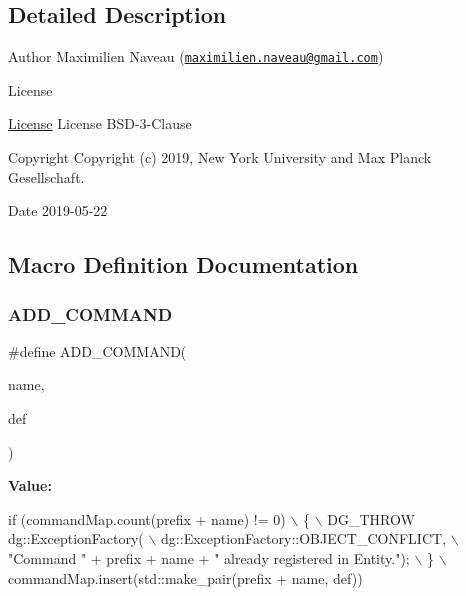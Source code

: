 \subsection{Detailed Description}
\begin{DoxyAuthor}{Author}
Maximilien Naveau (\href{mailto:maximilien.naveau@gmail.com}{\tt maximilien.\+naveau@gmail.\+com}) 
\end{DoxyAuthor}
\begin{DoxyRefDesc}{License}
\item[\hyperlink{license__license000052}{License}]License B\+S\+D-\/3-\/\+Clause \end{DoxyRefDesc}
\begin{DoxyCopyright}{Copyright}
Copyright (c) 2019, New York University and Max Planck Gesellschaft. 
\end{DoxyCopyright}
\begin{DoxyDate}{Date}
2019-\/05-\/22 
\end{DoxyDate}


\subsection{Macro Definition Documentation}
\mbox{\label{periodic-call_8cpp_a9e89a4fffa38d0e165c3e64293abe763}} 
\subsubsection{\texorpdfstring{A\+D\+D\+\_\+\+C\+O\+M\+M\+A\+ND}{ADD\_COMMAND}}
{\footnotesize\ttfamily \#define A\+D\+D\+\_\+\+C\+O\+M\+M\+A\+ND(\begin{DoxyParamCaption}\item[{}]{name,  }\item[{}]{def }\end{DoxyParamCaption})}

{\bfseries Value\+:}
\begin{DoxyCode}
\textcolor{keywordflow}{if} (commandMap.count(prefix + name) != 0)                               \(\backslash\)
    \{                                                                       \(\backslash\)
        DG\_THROW dg::ExceptionFactory(                                      \(\backslash\)
            dg::ExceptionFactory::OBJECT\_CONFLICT,                          \(\backslash\)
            \textcolor{stringliteral}{"Command "} + prefix + name + \textcolor{stringliteral}{" already registered in Entity."}); \(\backslash\)
    \}                                                                       \(\backslash\)
    commandMap.insert(std::make\_pair(prefix + name, def))
\end{DoxyCode}
